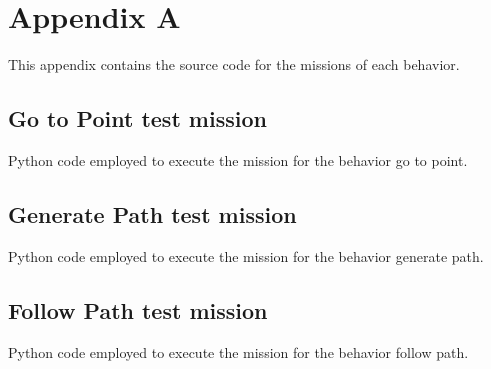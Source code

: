 \chapter{Appendix A}

This appendix contains the source code for the missions of each behavior.

\section{Go to Point test mission} \label{app1:go_to_point_mission}

Python code employed to execute the mission for the behavior go to point.

 

\section{Generate Path test mission} \label{app1:generate_path_mission}

Python code employed to execute the mission for the behavior generate path.

 

\section{Follow Path test mission} \label{app1:follow_path_mission}

Python code employed to execute the mission for the behavior follow path.



\begin{comment}
  \begin{itemize}
  \end{itemize}
\end{comment}


